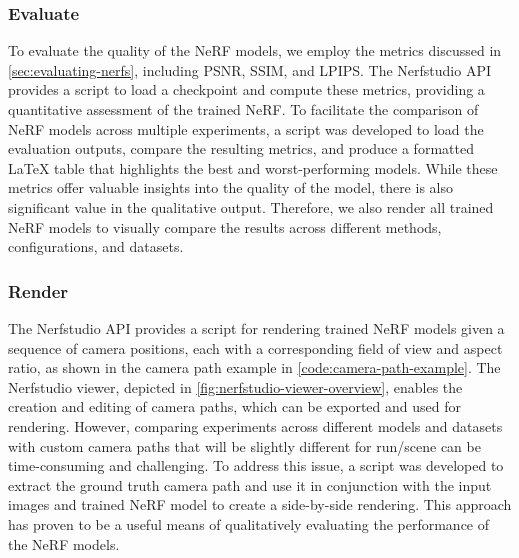 \subsubsection{Evaluate}

To evaluate the quality of the NeRF models, we employ the metrics discussed in \autoref{sec:evaluating-nerfs}, including PSNR, SSIM, and LPIPS. The Nerfstudio API provides a script to load a checkpoint and compute these metrics, providing a quantitative assessment of the trained NeRF. To facilitate the comparison of NeRF models across multiple experiments, a script was developed to load the evaluation outputs, compare the resulting metrics, and produce a formatted LaTeX table that highlights the best and worst-performing models. While these metrics offer valuable insights into the quality of the model, there is also significant value in the qualitative output. Therefore, we also render all trained NeRF models to visually compare the results across different methods, configurations, and datasets.



\subsubsection{Render} %

The Nerfstudio API provides a script for rendering trained NeRF models given a sequence of camera positions, each with a corresponding field of view and aspect ratio, as shown in the camera path example in \autoref{code:camera-path-example}. The Nerfstudio viewer, depicted in \autoref{fig:nerfstudio-viewer-overview}, enables the creation and editing of camera paths, which can be exported and used for rendering. However, comparing experiments across different models and datasets with custom camera paths that will be slightly different for run/scene can be time-consuming and challenging. To address this issue, a script was developed to extract the ground truth camera path and use it in conjunction with the input images and trained NeRF model to create a side-by-side rendering. This approach has proven to be a useful means of qualitatively evaluating the performance of the NeRF models.






